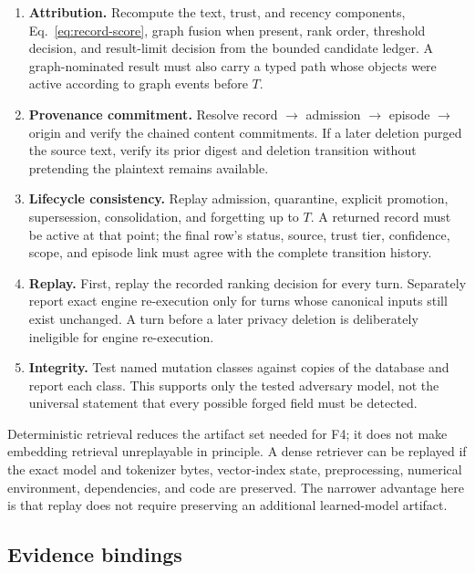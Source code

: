 \begin{enumerate}
  \item[\textbf{F1}] \textbf{Attribution.} Recompute the text, trust, and
  recency components, Eq.~\ref{eq:record-score}, graph fusion when present,
  rank order, threshold decision, and result-limit decision from the bounded
  candidate ledger. A graph-nominated result must also carry a typed path
  whose objects were active according to graph events before $T$.
  \item[\textbf{F2}] \textbf{Provenance commitment.} Resolve record
  $\rightarrow$ admission $\rightarrow$ episode $\rightarrow$ origin and
  verify the chained content commitments. If a later deletion purged the
  source text, verify its prior digest and deletion transition without
  pretending the plaintext remains available.
  \item[\textbf{F3}] \textbf{Lifecycle consistency.} Replay admission,
  quarantine, explicit promotion, supersession, consolidation, and forgetting
  up to $T$. A returned record must be active at that point; the final row's
  status, source, trust tier, confidence, scope, and episode link must agree
  with the complete transition history.
  \item[\textbf{F4}] \textbf{Replay.} First, replay the recorded ranking
  decision for every turn. Separately report exact engine re-execution only
  for turns whose canonical inputs still exist unchanged. A turn before a
  later privacy deletion is deliberately ineligible for engine re-execution.
  \item[\textbf{F5}] \textbf{Integrity.} Test named mutation classes against
  copies of the database and report each class. This supports only the tested
  adversary model, not the universal statement that every possible forged
  field must be detected.
\end{enumerate}

Deterministic retrieval reduces the artifact set needed for F4; it does not
make embedding retrieval unreplayable in principle. A dense retriever can be
replayed if the exact model and tokenizer bytes, vector-index state,
preprocessing, numerical environment, dependencies, and code are preserved.
The narrower advantage here is that replay does not require preserving an
additional learned-model artifact.

\subsection{Evidence bindings}
\label{sec:forensics-binding}


